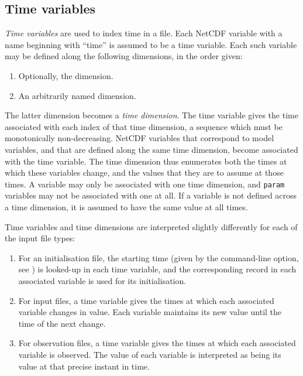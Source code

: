 \subsection{Time variables\label{Time_variables}}

\emph{Time variables} are used to index time in a file. Each NetCDF variable
with a name beginning with ``time'' is assumed to be a time variable. Each
such variable may be defined along the following dimensions, in the order
given:
\begin{enumerate}
\item Optionally, the  dimension.
\item An arbitrarily named dimension.
\end{enumerate}
The latter dimension becomes a \emph{time
  dimension}. The time variable gives the time
associated with each index of that time dimension, a sequence which must be
monotonically non-decreasing. NetCDF variables that correspond to model
variables, and that are defined along the same time dimension, become
associated with the time variable. The time dimension thus enumerates both the
times at which these variables change, and the values that they are to assume
at those times. A variable may only be associated with one time dimension, and
\texttt{param} variables may not be associated with one at all. If a variable
is not defined across a time dimension, it is assumed to have the same value
at all times.

Time variables and time dimensions are interpreted slightly differently for
each of the input file types:
\begin{enumerate}
\item For an initialisation file, the starting time (given by the
   command-line option, see ) is
  looked-up in each time variable, and the corresponding record in each
  associated variable is used for its initialisation.
\item For input files, a time variable gives the times at which each
  associated variable changes in value. Each variable maintains its new
  value until the time of the next change.
\item For observation files, a time variable gives the times at which each
  associated variable is observed. The value of each variable is interpreted
  as being its value at that precise instant in time.
\end{enumerate}

